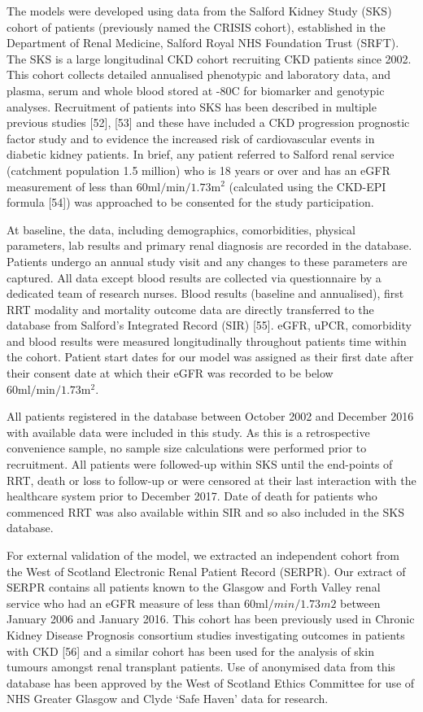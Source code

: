 \documentclass[12pt,twoside]{reedthesis}
\begin{document}
The models were developed using data from the Salford Kidney Study (SKS) cohort of patients (previously named the CRISIS cohort), established in the Department of Renal Medicine, Salford Royal NHS Foundation Trust (SRFT). The SKS is a large longitudinal CKD cohort recruiting CKD patients since 2002. This cohort collects detailed annualised phenotypic and laboratory data, and plasma, serum and whole blood stored at -80\textdegree C for biomarker and genotypic analyses. Recruitment of patients into SKS has been described in multiple previous studies {[}52{]}, {[}53{]} and these have included a CKD progression prognostic factor study and to evidence the increased risk of cardiovascular events in diabetic kidney patients. In brief, any patient referred to Salford renal service (catchment population 1.5 million) who is 18 years or over and has an eGFR measurement of less than \(60\textrm{ml}/\textrm{min}/1.73\textrm{m}^2\) (calculated using the CKD-EPI formula {[}54{]}) was approached to be consented for the study participation.

At baseline, the data, including demographics, comorbidities, physical parameters, lab results and primary renal diagnosis are recorded in the database. Patients undergo an annual study visit and any changes to these parameters are captured. All data except blood results are collected via questionnaire by a dedicated team of research nurses. Blood results (baseline and annualised), first RRT modality and mortality outcome data are directly transferred to the database from Salford's Integrated Record (SIR) {[}55{]}. eGFR, uPCR, comorbidity and blood results were measured longitudinally throughout patients time within the cohort. Patient start dates for our model was assigned as their first date after their consent date at which their eGFR was recorded to be below \(60\textrm{ml}/\textrm{min}/1.73\textrm{m}^2\).

All patients registered in the database between October 2002 and December 2016 with available data were included in this study. As this is a retrospective convenience sample, no sample size calculations were performed prior to recruitment. All patients were followed-up within SKS until the end-points of RRT, death or loss to follow-up or were censored at their last interaction with the healthcare system prior to December 2017. Date of death for patients who commenced RRT was also available within SIR and so also included in the SKS database.

For external validation of the model, we extracted an independent cohort from the West of Scotland Electronic Renal Patient Record (SERPR). Our extract of SERPR contains all patients known to the Glasgow and Forth Valley renal service who had an eGFR measure of less than \(60\textrm{ml}/min/1.73m2\) between January 2006 and January 2016. This cohort has been previously used in Chronic Kidney Disease Prognosis consortium studies investigating outcomes in patients with CKD {[}56{]} and a similar cohort has been used for the analysis of skin tumours amongst renal transplant patients. Use of anonymised data from this database has been approved by the West of Scotland Ethics Committee for use of NHS Greater Glasgow and Clyde `Safe Haven' data for research.
\end{document}
